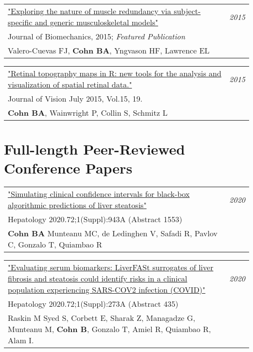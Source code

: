 \documentclass[10pt,a4paper]{article}
\begin{document}
\vspace*{1mm}\noindent\begin{tabularx}{17cm}{X r}
    \href{https://github.com/bc/resume/raw/master/papers/valero_cuevas_2015_job.pdf}{"Exploring the nature of muscle redundancy via subject-specific and generic musculoskeletal models" } & \textit{2015}\\
    Journal of Biomechanics, 2015; \textit{Featured Publication} \\
    Valero-Cuevas FJ, \textbf{Cohn BA}, Yngvason HF, Lawrence EL \\[2mm]
\end{tabularx}


\vspace*{1mm}\noindent\begin{tabularx}{17cm}{X r}
    \href{https://github.com/bc/resume/raw/master/papers/cohn_et_al_2015_jov.pdf}{"Retinal topography maps in R: new tools for the analysis and visualization of spatial retinal data."}  & \textit{2015}\\
    Journal of Vision July 2015, Vol.15, 19. \\
    \textbf{Cohn BA}, Wainwright P, Collin S, Schmitz L \\[2mm]
\end{tabularx}


\vspace*{3mm}\section*{Full-length Peer-Reviewed Conference Papers} 

\vspace*{1mm}\noindent\begin{tabularx}{17cm}{X r}
   \href{https://www.aasld.org/}{
   "Simulating clinical confidence intervals for black-box algorithmic predictions of liver steatosis"} & \textit{2020}\\
    Hepatology 2020.72;1(Suppl):943A (Abstract 1553) \\
   \textbf{Cohn BA} Munteanu MC, de Ledinghen V, Safadi R, Pavlov C, Gonzalo T, Quiambao R\\[2mm]
\end{tabularx}

\vspace*{1mm}\noindent\begin{tabularx}{17cm}{X r}
   \href{https://www.aasld.org/}{
   "Evaluating serum biomarkers: LiverFASt surrogates of liver fibrosis and steatosis could identify risks in a clinical population experiencing SARS-COV2 infection (COVID)"} & \textit{2020}\\
   Hepatology 2020.72;1(Suppl):273A (Abstract 435) \\
   Raskin M Syed S, Corbett E, Sharak Z, Managadze G, Munteanu M, \textbf{Cohn B}, Gonzalo T, Amiel R, Quiambao R, Alam I.\\[2mm]
\end{tabularx}
\end{document}
